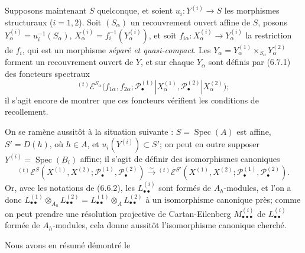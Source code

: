 \begin{env}[6.7.2]
Supposons maintenant $S$ quelconque, et soient
$u_i:Y^{(i)}\to S$ les morphismes structuraux ($i=1,2$). Soit $(S_\alpha)$ un
recouvrement ouvert affine de $S$, posons
$Y_\alpha^{(i)}=u_i^{-1}(S_\alpha)$,
$X_\alpha^{(i)}=f_i^{-1}(Y_\alpha^{(i)})$, et soit
$f_{i\alpha}:X_\alpha^{(i)}\to Y_\alpha^{(i)}$ la restriction de $f_i$, qui
est un morphisme \emph{séparé et quasi-compact}. Les
$Y_\alpha=Y_\alpha^{(1)}\times_{S_\alpha}Y_\alpha^{(2)}$ forment un
recouvrement ouvert de $Y$, et sur chaque $Y_\alpha$ sont définis par (6.7.1)
des foncteurs spectraux
\[
  {}^{(t)}\mathscr E^{S_\alpha}
  \bigl(f_{1\alpha},f_{2\alpha};
    \mathscr P_\bullet^{(1)}|X_\alpha^{(1)},
    \mathscr P_\bullet^{(2)}|X_\alpha^{(2)}\bigr);
\]
il s'agit encore de montrer que ces foncteurs vérifient les conditions de
recollement.

On se ramène aussitôt à la situation suivante :
$S=\operatorname{Spec}(A)$ est affine, $S'=D(h)$, où $h\in A$, et
$u_i(Y^{(i)})\subset S'$; on peut en outre supposer
$Y^{(i)}=\operatorname{Spec}(B_i)$ affine; il s'agit de définir des
isomorphismes canoniques
\[
  {}^{(t)}\mathscr E^S
  (X^{(1)},X^{(2)};
   \mathscr P_\bullet^{(1)},\mathscr P_\bullet^{(2)})
  \xrightarrow{\sim}
  {}^{(t)}\mathscr E^{S'}
  (X^{(1)},X^{(2)};
   \mathscr P_\bullet^{(1)},\mathscr P_\bullet^{(2)}).
  \tag{6.7.2.1}\label{III.6.7.2.1.fr}
\]
Or, avec les notations de (6.6.2), les $L_{\bullet\bullet}^{(i)}$ sont formés
de $A_h$-modules, et l'on a donc
$L_{\bullet\bullet}^{(1)}\otimes_{A_h}L_{\bullet\bullet}^{(2)}
=L_{\bullet\bullet}^{(1)}\otimes_A L_{\bullet\bullet}^{(2)}$ à un
isomorphisme canonique près; comme on peut prendre une résolution projective
de Cartan-Eilenberg $M_{\bullet\bullet\bullet}^{(i)}$ de
$L_{\bullet\bullet}^{(i)}$ formée de $A_h$-modules, cela donne aussitôt
l'isomorphisme canonique cherché.
\end{env}

Nous avons en résumé démontré le


